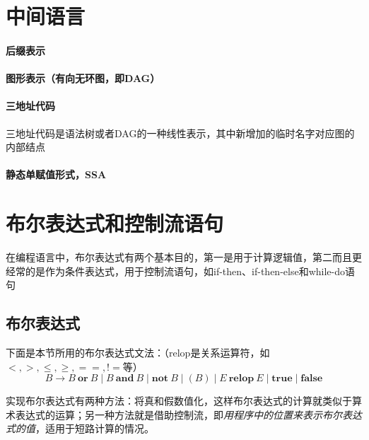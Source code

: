 \documentclass[]{report}
\begin{document}
	\section{中间语言}
		\paragraph{后缀表示}
		\paragraph{图形表示（有向无环图，即DAG）}
		\paragraph{三地址代码}
		三地址代码是语法树或者DAG的一种线性表示，其中新增加的临时名字对应图的内部结点
		\paragraph{静态单赋值形式，SSA}
	\section{布尔表达式和控制流语句}
		在编程语言中，布尔表达式有两个基本目的，第一是用于计算逻辑值，第二而且更经常的是作为条件表达式，用于控制流语句，如if-then、if-then-else和while-do语句
		\subsection{布尔表达式}
			下面是本节所用的布尔表达式文法：（relop是关系运算符，如$<,>,\le,\ge,==,!=$等）
			\[B\to B\ \mathbf{or}\ B\mid B\ \mathbf{and}\ B\mid\mathbf{not}\ B\mid(B)\mid E\ \mathbf{relop}\ E\mid\mathbf{true}\mid\mathbf{false}\]\par
			实现布尔表达式有两种方法：将真和假数值化，这样布尔表达式的计算就类似于算术表达式的运算；另一种方法就是借助控制流，即\textit{用程序中的位置来表示布尔表达式的值}，适用于短路计算的情况。
\end{document}
